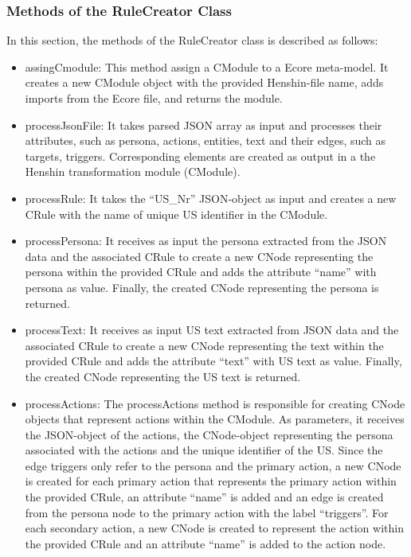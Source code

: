 \subsubsection*{Methods of the RuleCreator Class}
In this section, the methods of the RuleCreator class is described as follows:
\begin{itemize}
	
	\item assingCmodule: This method assign a CModule to a Ecore meta-model. It creates a new CModule object with the provided Henshin-file name, adds imports from the Ecore file, and returns the module.
	
	\item processJsonFile: It takes parsed JSON array as input and processes their attributes, such as persona, actions, entities, text and their edges, such as targets, triggers. Corresponding elements are created as output in a the Henshin transformation module (CModule).
	
	\item processRule: It takes the \enquote{US\_Nr} JSON-object as input and creates a new CRule with the name of unique US identifier in the CModule.
	
	\item processPersona: It receives as input the persona extracted from the JSON data and the associated CRule to create a new CNode representing the persona within the provided CRule and adds the attribute \enquote{name} with persona as value. Finally, the created CNode representing the persona is returned.
	
	\item processText: It receives as input US text extracted from JSON data and the associated CRule to create a new CNode representing the text within the provided CRule and adds the attribute \enquote{text} with US text as value. Finally, the created CNode representing the US text is returned.
	
	\item processActions: The processActions method is responsible for creating CNode objects that represent actions within the CModule. As parameters, it receives the JSON-object of the actions, the CNode-object representing the persona associated with the actions and the unique identifier of the US. Since the edge triggers only refer to the persona and the primary action, a new CNode is created for each primary action that represents the primary action within the provided CRule, an attribute \enquote{name} is added and an edge is created from the persona node to the primary action with the label \enquote{triggers}. For each secondary action, a new CNode is created to represent the action within the provided CRule and an attribute \enquote{name} is added to the action node.
	

\end{itemize}

